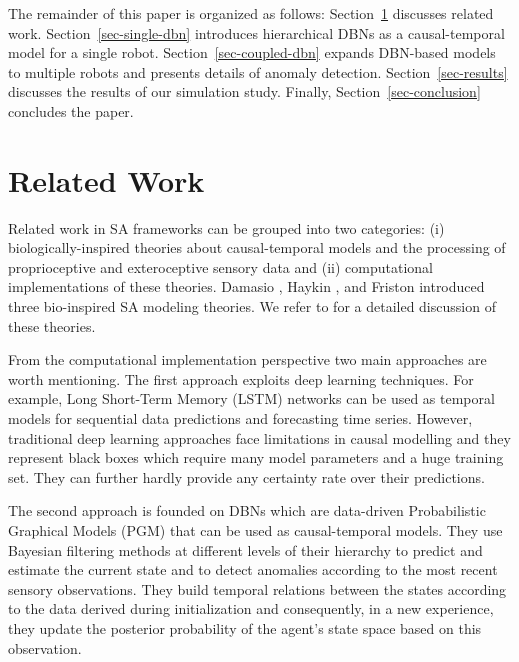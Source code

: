 \documentclass[runningheads]{llncs}
\begin{document}
The remainder of this paper is organized as follows: Section~\ref{sec-related-work} discusses related work. Section~\ref{sec-single-dbn} introduces hierarchical DBNs as a causal-temporal model for a single robot. Section~\ref{sec-coupled-dbn} expands DBN-based models to multiple robots and presents details of anomaly detection. Section~\ref{sec-results} discusses the results of our simulation study. Finally, Section~\ref{sec-conclusion} concludes the paper.
 
\section{Related Work}
\label{sec-related-work}

Related work in SA frameworks can be grouped into two categories: (i) biologically-inspired theories about causal-temporal models and the processing of proprioceptive and exteroceptive sensory data and (ii) computational implementations of these theories. 
Damasio \cite{damasio-2003-looking-for-spinoza-joy-sorrow-and-the-feeling-brain}, Haykin \cite{haykin-2012-cognitive-dynamic-systems-perception-action-cycle-radar-and-radio}, and Friston \cite{friston-2014-cognitive-dynamics-from-attractors-to-active-inference} introduced three bio-inspired SA modeling theories. We refer to \cite{regazzoni-2020-multi-sensorial-generative-and-descriptive-self-awareness-models-for-autonomous-systems} for a detailed discussion of these theories. 

From the computational implementation perspective two main approaches are worth mentioning. The first approach exploits deep learning techniques. For example, Long Short-Term Memory (LSTM) \cite{hochreiter-1997-long-short-term-memory} networks can be used as temporal models for sequential data predictions and forecasting time series. However, traditional deep learning approaches face limitations in causal modelling and they represent black boxes which require many model parameters and a huge training set. They can further hardly provide any certainty rate over their predictions.

The second approach is founded on DBNs which are data-driven Probabilistic Graphical Models (PGM) \cite{koller-2009-probabilistic-graphical-models-principles-and-techniques}  that can be used as causal-temporal models. They use Bayesian filtering methods at different levels of their hierarchy to predict and estimate the current state and to detect anomalies according to the most recent sensory observations. They build temporal relations between the states according to the data derived during initialization and consequently, in a new experience, they update the posterior probability of the agent's state space based on this observation. 
\end{document}
